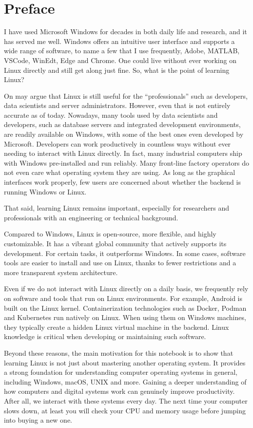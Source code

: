 \chapter*{Preface}

I have used Microsoft Windows for decades in both daily life and research, and it has served me well. Windows offers an intuitive user interface and supports a wide range of software, to name a few that I use frequently, Adobe, MATLAB, VSCode, WinEdt, Edge and Chrome. One could live without ever working on Linux directly and still get along just fine. So, what is the point of learning Linux?

On may argue that Linux is still useful for the ``professionals'' such as developers, data scientists and server administrators. However, even that is not entirely accurate as of today. Nowadays, many tools used by data scientists and developers, such as database servers and integrated development environments, are readily available on Windows, with some of the best ones even developed by Microsoft. Developers can work productively in countless ways without ever needing to interact with Linux directly. In fact, many industrial computers ship with Windows pre-installed and run reliably. Many front-line factory operators do not even care what operating system they are using. As long as the graphical interfaces work properly, few users are concerned about whether the backend is running Windows or Linux.

That said, learning Linux remains important, especially for researchers and professionals with an engineering or technical background.

Compared to Windows, Linux is open-source, more flexible, and highly customizable. It has a vibrant global community that actively supports its development. For certain tasks, it outperforms Windows. In some cases, software tools are easier to install and use on Linux, thanks to fewer restrictions and a more transparent system architecture.

Even if we do not interact with Linux directly on a daily basis, we frequently rely on software and tools that run on Linux environments. For example, Android is built on the Linux kernel. Containerization technologies such as Docker, Podman and Kubernetes run natively on Linux. When using them on Windows machines, they typically create a hidden Linux virtual machine in the backend. Linux knowledge is critical when developing or maintaining such software.

Beyond these reasons, the main motivation for this notebook is to show that learning Linux is not just about mastering another operating system. It provides a strong foundation for understanding computer operating systems in general, including Windows, macOS, UNIX and more. Gaining a deeper understanding of how computers and digital systems work can genuinely improve productivity. After all, we interact with these systems every day. The next time your computer slows down, at least you will check your CPU and memory usage before jumping into buying a new one.

